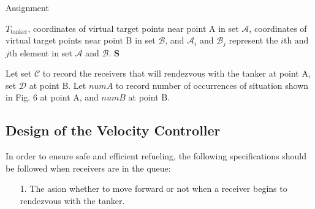 \begin{algorithm}[!h]
	\caption{Assignment}%
	\begin{algorithmic}[1]%
		\REQUIRE $ {T}_{\text{tanker}} $,  coordinates of virtual target points near point A in set $ \mathcal{A} $, coordinates of virtual target points near point B in set $ \mathcal{B} $, and $   \mathcal{A} _{i} $ and $  \mathcal{B}_{j} $ represent the $ i $th and $ j $th element in set $ \mathcal{A} $ and $ \mathcal{B} $.
		\ENSURE $ \textbf{S} $
		
		Let set $ \mathcal{C} $ to record the receivers that will rendezvous with the tanker at point A, set $ \mathcal{D} $ at point B. Let $ numA $ to record number of occurrences of situation shown in Fig. 6 at point A, and $ numB $ at point B.
		
		\ENDIF
		\ENDIF
		\ENDIF
		
		\ENDFOR
	\end{algorithmic}
\end{algorithm}


\subsection{Design of the Velocity Controller}\label{SCM}
In order to ensure safe and efficient refueling, the following specifications should be followed when receivers are in the queue:
\begin{itemize}
	\item [ 1.] The asion whether to move forward or not when a receiver begins to rendezvous with the tanker.
\end{itemize}

